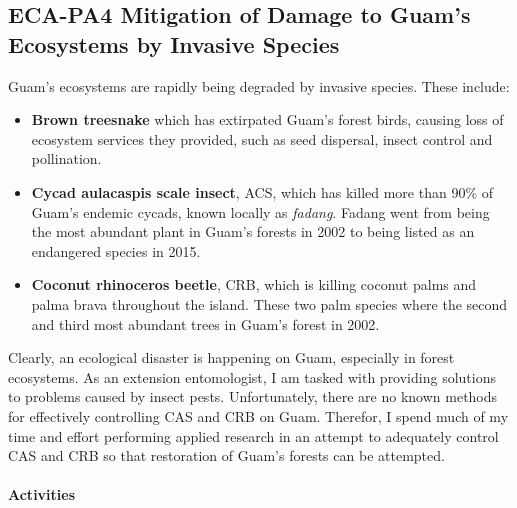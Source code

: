 \begin{refsection}
\begin{comment}
\paragraph{Plans for 15JUN2022-14JUN2023}

With the limited space problem partially solved, I intend to re-established the UOG insect collection internship to train entomology students how to curate an institutional insect collection.
The current focus will be on adding specimen images to the online database.
\end{comment}

\printbibliography[heading=none]
\end{refsection}

\subsection{ECA-PA4 Mitigation of Damage to Guam's Ecosystems by Invasive Species}

Guam's ecosystems are rapidly being degraded by invasive species. These include:
\begin{itemize}
	\item \textbf{Brown treesnake} which has extirpated Guam's forest birds, causing loss of ecosystem services they provided, such as seed dispersal, insect control and pollination.
	\item \textbf{Cycad aulacaspis scale insect}, ACS, which has killed more than 90\% of Guam's endemic cycads, known locally as \textit{fadang}. Fadang went from being the most abundant plant in Guam's forests in 2002 to being listed as an endangered species in 2015.
	\item \textbf{Coconut rhinoceros beetle}, CRB, which is killing coconut palms and palma brava throughout the island. These two palm species where the second and third most abundant trees in Guam's forest in 2002. 
\end{itemize}

Clearly, an ecological disaster is happening on Guam, especially in forest ecosystems. As an extension entomologist, I am tasked with providing solutions to problems caused by insect pests. Unfortunately, there are no known methods for effectively controlling CAS and CRB on Guam. Therefor, I spend much of my time and effort performing applied research in an attempt to adequately control CAS and CRB so that restoration of Guam's forests can be attempted. 

\paragraph{Activities}

